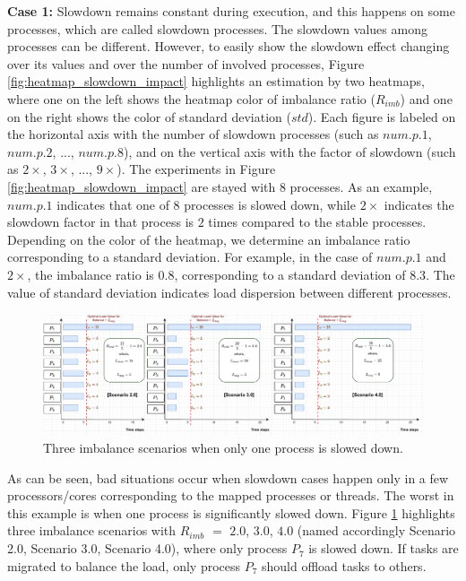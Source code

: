 \noindent \textbf{Case 1:} Slowdown remains constant during execution, and this happens on some processes, which are called slowdown processes. The slowdown values among processes can be different. However, to easily show the slowdown effect changing over its values and over the number of involved processes, Figure \ref{fig:heatmap_slowdown_impact} highlights an estimation by two heatmaps, where one on the left shows the heatmap color of imbalance ratio ($R_{imb}$) and one on the right shows the color of standard deviation ($std$). Each figure is labeled on the horizontal axis with the number of slowdown processes (such as $num.p.1$, $num.p.2$, ..., $num.p.8$), and on the vertical axis with the factor of slowdown (such as $2\times$, $3\times$, ..., $9\times$). The experiments in Figure \ref{fig:heatmap_slowdown_impact} are stayed with $8$ processes. As an example, $num.p.1$ indicates that one of $8$ processes is slowed down, while $2\times$ indicates the slowdown factor in that process is $2$ times compared to the stable processes. Depending on the color of the heatmap, we determine an imbalance ratio corresponding to a standard deviation. For example, in the case of $num.p.1$ and $2\times$, the imbalance ratio is $0.8$, corresponding to a standard deviation of $8.3$. The value of standard deviation indicates load dispersion between different processes.\\

\begin{figure}[t]
  \centering
  \includegraphics[scale=0.45]{./pictures/perf_analysis_model/perf_analysis_deterministic_model_imb_cases.pdf}
	\caption{Three imbalance scenarios when only one process is slowed down.}
	\label{fig:three_imb_situations_with_one_slow}
\end{figure}

As can be seen, bad situations occur when slowdown cases happen only in a few processors/cores corresponding to the mapped processes or threads. The worst in this example is when one process is significantly slowed down. Figure \ref{fig:three_imb_situations_with_one_slow} highlights three imbalance scenarios with $R_{imb}$ $=$ $2.0$, $3.0$, $4.0$ (named accordingly Scenario 2.0, Scenario 3.0, Scenario 4.0), where only process $P_{7}$ is slowed down. If tasks are migrated to balance the load, only process $P_{7}$ should offload tasks to others.\\

